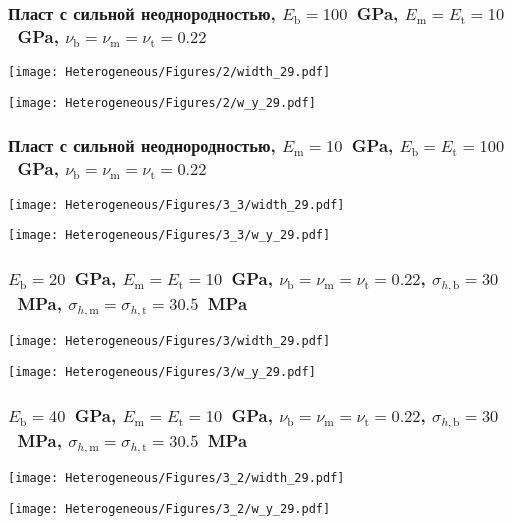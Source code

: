 \begin{frame}
    \frametitle{Пласт с сильной неоднородностью, $E_\text{b} = 100$~GPa, $E_\text{m} = E_\text{t} = 10$~GPa, $\nu_\text{b} = \nu_\text{m} = \nu_\text{t} = 0.22$}
    \begin{minipage}[t]{0.4\linewidth}
        \texttt{[image: Heterogeneous/Figures/2/width\_29.pdf]}
    \end{minipage}
    \hfill
    \begin{minipage}[t]{0.57\linewidth}
        \texttt{[image: Heterogeneous/Figures/2/w\_y\_29.pdf]}
    \end{minipage}
\end{frame}

\begin{frame}
    \frametitle{Пласт с сильной неоднородностью, $E_\text{m} = 10$~GPa, $E_\text{b} = E_\text{t} = 100$~GPa, $\nu_\text{b} = \nu_\text{m} = \nu_\text{t} = 0.22$}
    \begin{minipage}[t]{0.4\linewidth}
        \texttt{[image: Heterogeneous/Figures/3\_3/width\_29.pdf]}
    \end{minipage}
    \hfill
    \begin{minipage}[t]{0.57\linewidth}
        \texttt{[image: Heterogeneous/Figures/3\_3/w\_y\_29.pdf]}
    \end{minipage}
\end{frame}

\begin{frame}
    \frametitle{$E_\text{b} = 20$~GPa, $E_\text{m} = E_\text{t} = 10$~GPa, $\nu_\text{b} = \nu_\text{m} = \nu_\text{t} = 0.22$, $\sigma_{h,\text{b}} = 30$~MPa, $\sigma_{h,\text{m}} = \sigma_{h,\text{t}} = 30.5$~MPa}
    \begin{minipage}[t]{0.4\linewidth}
        \texttt{[image: Heterogeneous/Figures/3/width\_29.pdf]}
    \end{minipage}
    \hfill
    \begin{minipage}[t]{0.57\linewidth}
        \texttt{[image: Heterogeneous/Figures/3/w\_y\_29.pdf]}
    \end{minipage}
\end{frame}

\begin{frame}
    \frametitle{$E_\text{b} = 40$~GPa, $E_\text{m} = E_\text{t} = 10$~GPa, $\nu_\text{b} = \nu_\text{m} = \nu_\text{t} = 0.22$, $\sigma_{h,\text{b}} = 30$~MPa, $\sigma_{h,\text{m}} = \sigma_{h,\text{t}} = 30.5$~MPa}
    \begin{minipage}[t]{0.4\linewidth}
        \texttt{[image: Heterogeneous/Figures/3\_2/width\_29.pdf]}
    \end{minipage}
    \hfill
    \begin{minipage}[t]{0.57\linewidth}
        \texttt{[image: Heterogeneous/Figures/3\_2/w\_y\_29.pdf]}
    \end{minipage}
\end{frame}

